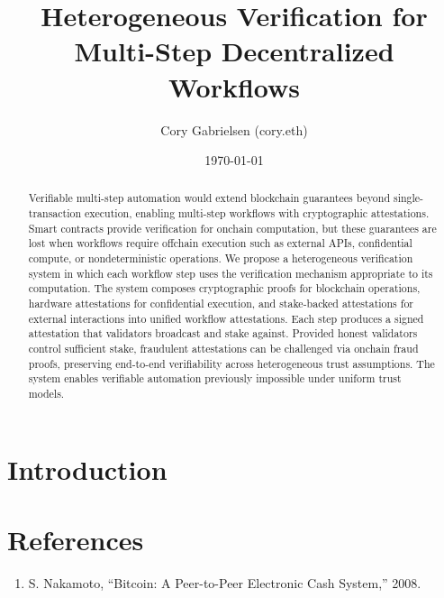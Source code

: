 \documentclass[11pt]{article}
\title{Heterogeneous Verification for Multi-Step Decentralized Workflows}
\author{Cory Gabrielsen (cory.eth)}
\date{\today}
\begin{document}
\maketitle

\begin{abstract}
Verifiable multi-step automation would extend blockchain guarantees beyond single-transaction execution, enabling multi-step workflows with cryptographic attestations. Smart contracts provide verification for onchain computation, but these guarantees are lost when workflows require offchain execution such as external APIs, confidential compute, or nondeterministic operations. We propose a heterogeneous verification system in which each workflow step uses the verification mechanism appropriate to its computation. The system composes cryptographic proofs for blockchain operations, hardware attestations for confidential execution, and stake-backed attestations for external interactions into unified workflow attestations. Each step produces a signed attestation that validators broadcast and stake against. Provided honest validators control sufficient stake, fraudulent attestations can be challenged via onchain fraud proofs, preserving end-to-end verifiability across heterogeneous trust assumptions. The system enables verifiable automation previously impossible under uniform trust models.
\end{abstract}

\section{Introduction}


\section*{References}

\begin{enumerate}
\item[{[1]}] S. Nakamoto, ``Bitcoin: A Peer-to-Peer Electronic Cash System,'' 2008.
\end{enumerate}
\end{document}
